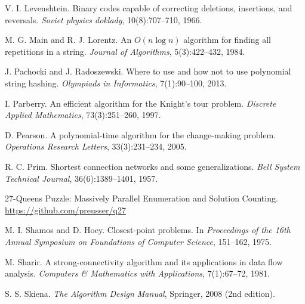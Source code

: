 \begin{thebibliography}{9}
    V. I. Levenshtein.
    Binary codes capable of correcting deletions, insertions, and reversals.
    \emph{Soviet physics doklady}, 10(8):707--710, 1966.

    M. G. Main and R. J. Lorentz.
    An $O(n \log n)$ algorithm for finding all repetitions in a string.
    \emph{Journal of Algorithms}, 5(3):422--432, 1984.


    J. Pachocki and J. Radoszewski.
    Where to use and how not to use polynomial string hashing.
    \emph{Olympiads in Informatics}, 7(1):90--100, 2013.

    I. Parberry.
    An efficient algorithm for the Knight's tour problem.
    \emph{Discrete Applied Mathematics}, 73(3):251--260, 1997.


    D. Pearson.
    A polynomial-time algorithm for the change-making problem.
    \emph{Operations Research Letters}, 33(3):231--234, 2005.

    R. C. Prim.
    Shortest connection networks and some generalizations.
    \emph{Bell System Technical Journal}, 36(6):1389--1401, 1957.


    27-Queens Puzzle: Massively Parallel Enumeration and Solution Counting.
    \url{https://github.com/preusser/q27}

    M. I. Shamos and D. Hoey.
    Closest-point problems.
    In \emph{Proceedings of the 16th Annual Symposium on Foundations of Computer Science}, 151--162, 1975.

    M. Sharir.
    A strong-connectivity algorithm and its applications in data flow analysis.
    \emph{Computers \& Mathematics with Applications}, 7(1):67--72, 1981.

    S. S. Skiena.
    \emph{The Algorithm Design Manual}, Springer, 2008 (2nd edition).


\end{thebibliography}
